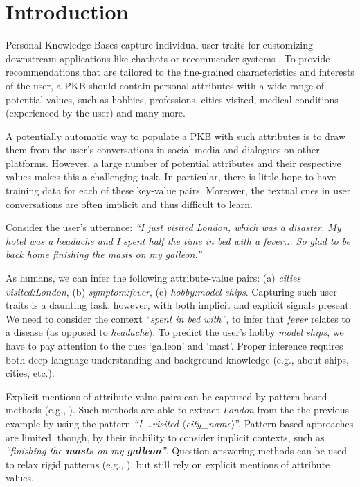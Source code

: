 \section{Introduction}

 Personal Knowledge Bases 
capture individual user traits
for %
customizing
downstream applications like chatbots
or recommender systems \cite{Balog:2019:TSE:3331184.3331211}.
To provide recommendations that are tailored to the fine-grained characteristics and interests of the user, a PKB should contain personal attributes with a wide range of potential values, such as hobbies, professions, cities visited, medical conditions 
(experienced by the user) and many more.

A potentially automatic way to populate a PKB with such attributes is to 
draw them from the user's conversations in social media and dialogues on other platforms. However, a large number of potential attributes 
and their respective values makes this a challenging task. In particular, there is little hope to have training data for each of these key-value pairs.
Moreover, the textual cues in user conversations are often implicit
and thus difficult to learn.

Consider the user's utterance:
\textit{``I just visited London, which was a disaster. My hotel was a headache and I spent half the time in bed with a fever... So glad to be back home finishing the masts on my galleon.''}

As humans, we can infer the following attribute-value pairs: 
(a) \textit{cities visited:London}, (b) \textit{symptom:fever},
(c) \textit{hobby:model ships}. 
Capturing such user traits is a daunting task, however, with both implicit and explicit signals present.
We need to consider the context \textit{``spent in bed with''}, to infer that \textit{fever} relates to a disease (as opposed to \textit{headache}). 
To predict the user's hobby \textit{model ships}, we have to pay attention to the cues `galleon' and `mast'.
Proper inference requires both deep language understanding and background knowledge
(e.g., about ships, cities,
etc.).

\vspace{0.1cm}
Explicit mentions of attribute-value pairs can be captured by pattern-based methods (e.g., \cite{dial7,Yen:2019:PKB:3331184.3331209}).
Such methods are able to extract \textit{London} 
from the the previous example by using the pattern \textit{``I \dots visited $\langle$city\_name$\rangle$}''.  
Pattern-based approaches are limited, though, by
their inability to consider implicit contexts, such as %
{\em ``finishing the \textbf{masts} on my \textbf{galleon}''}. 
Question answering methods can be used to relax rigid patterns 
(e.g., \cite{levy2017zero}), 
but still rely on explicit mentions of attribute values.

